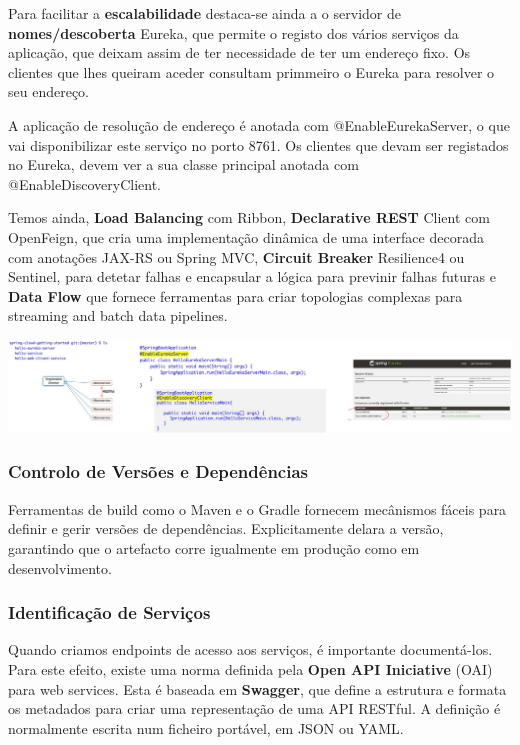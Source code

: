 \documentclass{article}
\begin{document}
\vspace{2mm}

Para facilitar a \textbf{escalabilidade} destaca-se ainda a o servidor de \textbf{nomes/descoberta} Eureka, que permite o registo dos
vários serviços da aplicação, que deixam assim de ter necessidade de ter um endereço fixo. Os clientes que lhes
queiram aceder consultam primmeiro o Eureka para resolver o seu endereço.

A aplicação de resolução de endereço é anotada com @EnableEurekaServer, o que vai disponibilizar este serviço no
porto 8761. Os clientes que devam ser registados no Eureka, devem ver a sua classe principal anotada com
@EnableDiscoveryClient.

\pagebreak

Temos ainda, \textbf{Load Balancing} com Ribbon,
\textbf{Declarative REST} Client com OpenFeign, que cria uma implementação
dinâmica de uma interface decorada com anotações JAX-RS ou Spring MVC,
\textbf{Circuit Breaker} Resilience4 ou Sentinel, para detetar falhas
e encapsular a lógica para previnir falhas futuras e
\textbf{Data Flow} que fornece ferramentas para criar topologias
complexas para streaming
and batch data pipelines.

\begin{center}
  \includegraphics[scale=0.5]{105}
\end{center}

\subsubsection{Controlo de Versões e Dependências}

Ferramentas de build como o Maven e o Gradle fornecem mecânismos
fáceis para definir e gerir versões de dependências.
Explicitamente delara a versão, garantindo que o artefacto corre
igualmente em produção como em desenvolvimento.

\subsubsection{Identificação de Serviços}

Quando criamos endpoints de acesso aos serviços, é importante documentá-los. Para este
efeito, existe uma norma definida pela \textbf{Open API Iniciative} (OAI) para web services.
Esta é baseada em \textbf{Swagger}, que define a estrutura e formata
os metadados para criar uma representação de uma API RESTful.
A definição é normalmente escrita num ficheiro portável, em JSON ou YAML.
\end{document}
